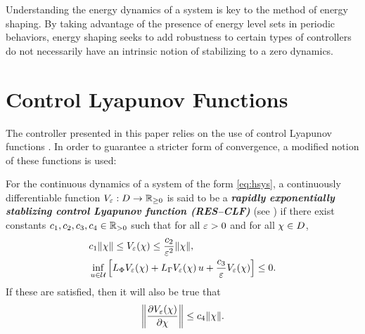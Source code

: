 Understanding the energy dynamics of a system is key to the method of energy shaping.
%
By taking advantage of the presence of energy level sets in periodic behaviors, energy shaping seeks to add robustness to certain types of controllers do not necessarily have an intrinsic notion of stabilizing to a zero dynamics.
%


\section{Control Lyapunov Functions}

The controller presented in this paper relies on the use of control Lyapunov functions \cite{Artstein83,FreeKoko}.
%
In order to guarantee a stricter form of convergence, a modified notion of these functions is used:\vgap

\begin{definition}
  \label{def:res-clf}
  For the continuous dynamics of a system of the form \eqref{eq:hsys}, a continuously differentiable function $V_{\varepsilon} : D \to \mathbb{R}_{\geq 0}$ is said to be a {\bf \em rapidly exponentially stablizing control Lyapunov function (RES--CLF)} (see \cite{AmGaSrGr14}) if there exist constants $c_{1}, c_{2}, c_{3}, c_{4} \in \mathbb{R}_{> 0}$ such that for all $\varepsilon > 0$ and for all $\chi \in D$,
  \begin{eqnarray}
    &c_{1} \|\chi\| \leq V_{\varepsilon}(\chi) \leq \frac{c_{2}}{\varepsilon^{2}} \|\chi\|,\\
    \nonumber
    &\inf_{u \in \mathcal{U}} \left[ L_{\Phi} V_{\varepsilon}(\chi) + L_{\Gamma} V_{\varepsilon}(\chi) \, u + \frac{c_{3}}{\varepsilon} V_{\varepsilon}(\chi) \right] \leq 0.
  \end{eqnarray}
  If these are satisfied, then it will also be true that
  \begin{align}
    \label{eq:dVedx-bounds}
    \left\| \frac{\partial{V_{\varepsilon}(\chi)}}{\partial{\chi}} \right\| \leq c_{4} \|\chi\|.
  \end{align}
\end{definition}
\


